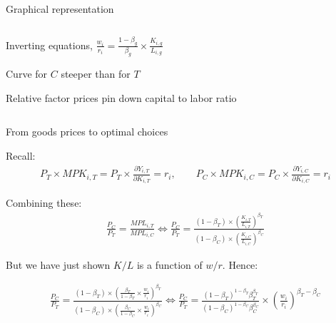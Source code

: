 \documentclass[notes,11pt, aspectratio=169, xcolor=table]{beamer}
\newenvironment{wideitemize}{\itemize\addtolength{\itemsep}{10pt}}{\enditemize}
\begin{document}
\begin{frame}{Graphical representation}
\begin{columns}[T]
\begin{column}{.5\textwidth}
\begin{wideitemize}
    \item Inverting equations, $\frac{w_i}{r_i} = \frac{1-\beta_g}{\beta_g} \times \frac{K_{i,g}}{L_{i,g}}$

    \item Curve for $C$ steeper than for $T$

    \item Relative factor prices pin down capital to labor ratio
    \end{wideitemize}
    


    \end{column}
\end{columns}
\end{frame}

\begin{frame}{From goods prices to optimal choices}

        \begin{wideitemize}
            \item Recall:
                \begin{eqnarray*}
            P_T \times MPK_{i,T} =  P_T \times  \frac{\partial Y_{i,T}}{\partial K_{i,T}} = r_{i}, \qquad P_C \times MPK_{i,C} = P_C \times  \frac{\partial Y_{i,C}}{\partial K_{i,C}} = r_{i}
        \end{eqnarray*}

            \item<2-> Combining these:
\begin{eqnarray*}
    \frac{P_C}{P_T} = \frac{MPL_{i,T}}{MPL_{i,C}} \iff 
    \frac{P_C}{P_T} = \frac{(1-\beta_T) \times \left( \frac{K_{i,T}}{L_{i,T}} \right)^{\beta_T}}{ (1-\beta_C) \times \left( \frac{K_{i,C}}{L_{i,C}} \right)^{\beta_C}}  
\end{eqnarray*}

                \item<3-> But we have just shown $K/L$ is a function of $w/r$. Hence:
                
\begin{eqnarray*}\label{eq: goods-factor-prices}
    \frac{P_C}{P_T} = \frac{(1-\beta_T) \times \left( \frac{\beta_T}{1-\beta_T} \times \frac{w_i}{r_i}  \right)^{\beta_T}}{ (1-\beta_C) \times \left( \frac{\beta_C}{1-\beta_C} \times \frac{w_i}{r_i} \right)^{\beta_C}} \iff \frac{P_C}{P_T} = \frac{(1-\beta_T)^{1-\beta_T} \beta_T^{\beta_T}}{ (1-\beta_C)^{1-\beta_C} \beta_C^{\beta_C} } \times \left(  \frac{w_i}{r_i} \right)^{\beta_T - \beta_C}
\end{eqnarray*} 


\end{wideitemize}
\end{frame}
\end{document}
